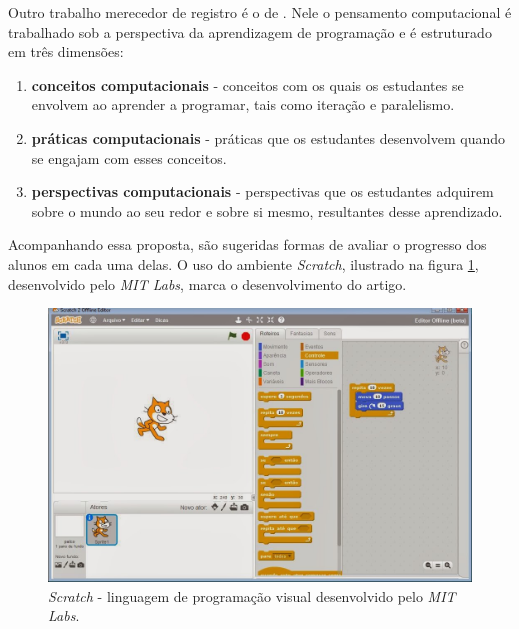 

Outro trabalho merecedor de registro é o de . Nele o pensamento computacional é trabalhado sob a perspectiva da aprendizagem de programação e é estruturado em três dimensões: 

\begin{enumerate}
\item \textbf{conceitos computacionais} - conceitos com os quais os estudantes se envolvem ao aprender a programar, tais como iteração e paralelismo.

\item \textbf{práticas computacionais} - práticas que os estudantes desenvolvem quando se engajam com esses conceitos.

\item \textbf{perspectivas computacionais} - perspectivas que os estudantes adquirem sobre o mundo ao seu redor e sobre si mesmo, resultantes desse aprendizado.
\end{enumerate}

Acompanhando essa proposta, são sugeridas formas de avaliar o progresso dos alunos em cada uma delas. O uso do ambiente \textit{Scratch}, ilustrado na figura \ref{fig:scratch}, desenvolvido pelo \textit{MIT Labs}, marca o desenvolvimento do artigo.

\begin{figure}[!htb]
	\caption{\textit{Scratch} - linguagem de programação visual desenvolvido pelo \textit{MIT Labs}.}
  \begin{center}
	  \includegraphics[max width=\textwidth]{imagens/scratch}
	\end{center}
	\label{fig:scratch}
\end{figure}

